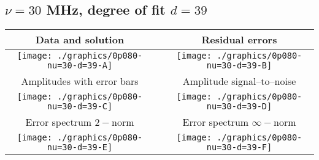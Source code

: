 

% 

\clearpage{}
\break{}

\subsection{$\nu = 30$ MHz, degree of fit $d = 39$}

\begin{table}[h]
    \begin{center}
        \begin{tabular}{ccc}
            Data and solution & \quad & Residual errors \\\hline
            \texttt{[image: ./graphics/0p080-nu=30-d=39-A]} &&
            \texttt{[image: ./graphics/0p080-nu=30-d=39-B]} \\[15pt]
            Amplitudes with error bars && Amplitude signal--to--noise \\\hline
            \texttt{[image: ./graphics/0p080-nu=30-d=39-C]} &&
            \texttt{[image: ./graphics/0p080-nu=30-d=39-D]} \\[15pt]
            Error spectrum $2-$norm && Error spectrum $\infty-$norm \\\hline
            \texttt{[image: ./graphics/0p080-nu=30-d=39-E]} &&
            \texttt{[image: ./graphics/0p080-nu=30-d=39-F]} \\[15pt]
        \end{tabular}
    \end{center}
\label{fig:elev=80, nu=30}
\end{table}



\endinput
